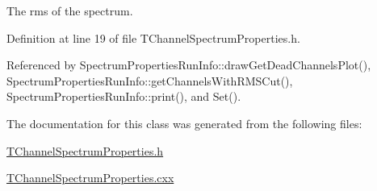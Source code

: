 The rms of the spectrum. 

Definition at line 19 of file TChannelSpectrumProperties.h.

Referenced by SpectrumPropertiesRunInfo::drawGetDeadChannelsPlot(), SpectrumPropertiesRunInfo::getChannelsWithRMSCut(), SpectrumPropertiesRunInfo::print(), and Set().

The documentation for this class was generated from the following files:\begin{DoxyCompactItemize}
\item 
\hyperlink{_t_channel_spectrum_properties_8h}{TChannelSpectrumProperties.h}\item 
\hyperlink{_t_channel_spectrum_properties_8cxx}{TChannelSpectrumProperties.cxx}\end{DoxyCompactItemize}
